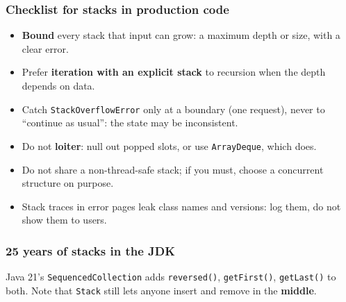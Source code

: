 \documentclass[aspectratio=169,10pt,compress]{beamer}
\begin{document}
\begin{frame}[t,fragile] \frametitle{Checklist for stacks in production code}
  \begin{itemize}
    \item \textbf{Bound} every stack that input can grow: a maximum depth or size, with a clear error.
    \item Prefer \textbf{iteration with an explicit stack} to recursion when the depth depends on data.
    \item Catch \texttt{StackOverflowError} only at a boundary (one request), never to ``continue as usual'': the state may be inconsistent.
    \item Do not \textbf{loiter}: null out popped slots, or use \texttt{ArrayDeque}, which does.
    \item Do not share a non-thread-safe stack; if you must, choose a concurrent structure on purpose.
    \item Stack traces in error pages leak class names and versions: log them, do not show them to users.
  \end{itemize}
\end{frame}





\begin{frame}[t,fragile] \frametitle{25 years of stacks in the JDK}

  \vspace{0.2em}
  \small Java 21's \texttt{SequencedCollection} adds \texttt{reversed()}, \texttt{getFirst()}, \texttt{getLast()} to both. Note that \texttt{Stack}
  still lets anyone insert and remove in the \textbf{middle}.
\end{frame}
\end{document}
